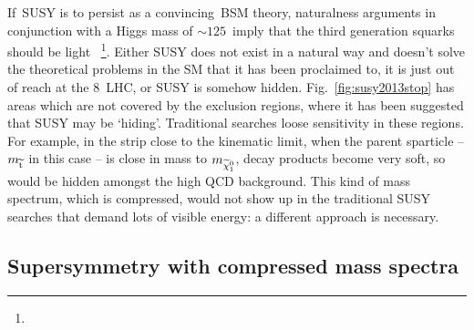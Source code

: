 If~\ac{SUSY} is to persist as a convincing~\ac{BSM} theory, 
naturalness arguments in conjunction with a Higgs mass of $\sim 125$~\GeV imply that the third generation squarks should be light~\cite{natSUSYhiggs}
\footnote{}.
Either \ac{SUSY} does not exist in a natural way and doesn't solve the theoretical problems in the \ac{SM} that it has been proclaimed to, it is just out of reach at the 8~\TeV \ac{LHC}, or \ac{SUSY} is somehow hidden.
Fig.~\ref{fig:susy2013stop} has areas which are not covered by the exclusion regions, 
where it has been suggested that \ac{SUSY} may be `hiding'. 
Traditional searches loose sensitivity in these regions.
For example, in the strip close to the kinematic limit, 
when the parent sparticle -- $m_{\widetilde{{\rm t}}}$ in this case -- is close in mass to $m_{\widetilde{\chi}^{0}_{1}}$,
decay products become very soft, so would be hidden amongst the high \ac{QCD} background.
This kind of mass spectrum, which is compressed, would not show up in the traditional \ac{SUSY} searches that demand lots of visible energy: 
a different approach is necessary.


\subsection{Supersymmetry with compressed mass spectra \label{th:CMPsusy}}

